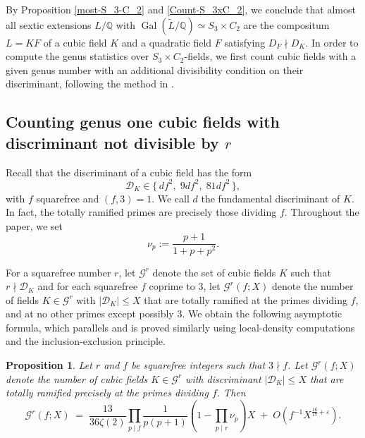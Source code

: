 \documentclass[11pt,reqno]{amsart}
\newcommand{\Q}{\mathbb{Q}}
\newcommand{\cD}{\mathcal{D}}
\newcommand{\cG}{\mathcal{G}}
\DeclareMathOperator{\Gal}{Gal}
\newtheorem{proposition}[theorem]{Proposition}
\theoremstyle{definition}
\theoremstyle{remark}
\begin{document}
  
By Proposition \ref{most-S_3-C_2} and \ref{Count-S_3xC_2}, we conclude that almost all sextic extensions $L/\Q$ with $\Gal(\widetilde{L}/\Q)\simeq S_3\times C_2$ are the compositum $L=K F$ of a cubic field $K$ and a quadratic field $F$ satisfying $D_F\nmid D_K$. In order to compute the genus statistics over $S_3\times C_2$-fields, we first count cubic fields with a given genus number with an additional divisibility condition on their discriminant, following the method in \cite{cubicwithgenusnumber1}.

\subsection{Counting genus one cubic fields with discriminant not divisible by $r$}
Recall that the discriminant of a cubic field has the form
\[
\cD_K \in \{\, df^2, \; 9df^2, \; 81df^2 \,\},
\]
with $f$ squarefree and $(f,3)=1$. We call $d$ the fundamental discriminant of $K$. In fact, the totally ramified primes are precisely those dividing $f$.  Throughout the paper, we set 
$$
    \nu_p :=\frac{p+1}{1+p+p^2}.
$$

\medskip
For a squarefree number $r$, let $\cG^r$ denote the set of cubic fields $K$ such that $r\nmid \cD_K$ and for each squarefree $f$ coprime to $3$, let $\cG^r(f;X)$ denote the number of fields $K \in \cG^r$ with $|\cD_K| \leq X$ that are totally ramified at the primes dividing $f$, and at no other primes except possibly $3$.  We obtain the following asymptotic formula, which parallels \cite[Proposition 3.1]{cubicwithgenusnumber1} and is proved similarly using local-density computations and the inclusion-exclusion principle.
 
\begin{proposition}\label{cubicfieds:totally_ramified_without3}
Let $r$ and $f$ be squarefree integers such that $3\nmid f$. Let $\cG^r(f; X)$ denote the number of cubic fields $K \in \cG^r$ with discriminant $|\cD_K| \leq X$ that are totally ramified precisely at the primes dividing $f$. Then
\[
\cG^r(f; X) \;=\; \frac{13}{36 \zeta(2)} \prod_{p \mid f} \frac{1}{p(p+1)} 
\left( 1 - \prod_{p \mid r} \nu_p \right) X \;+\; O\!\left( f^{-1} X^{\tfrac{16}{17} + \varepsilon} \right).
\]
\end{proposition}
\end{document}
